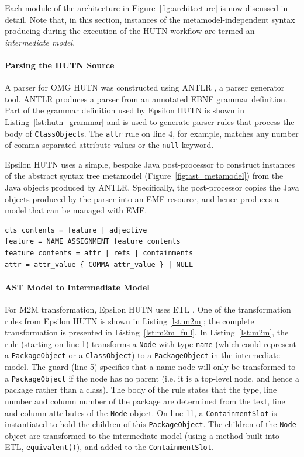 Each module of the architecture in Figure~\ref{fig:architecture} is now discussed in detail. Note that, in this section, instances of the metamodel-independent syntax producing during the execution of the HUTN workflow are termed an \textit{intermediate model}.

\paragraph{Parsing the HUTN Source}
A parser for OMG HUTN was constructed using ANTLR \cite{parr07antlr}, a parser generator tool. ANTLR produces a parser from an annotated EBNF grammar definition. Part of the grammar definition used by Epsilon HUTN is shown in Listing~\ref{lst:hutn_grammar} and is used to generate parser rules that process the body of \texttt{Cl\-a\-ssOb\-je\-ct}s. The \texttt{attr} rule on line 4, for example, matches any number of comma separated attribute values or the \texttt{null} keyword.

Epsilon HUTN uses a simple, bespoke Java post-processor to construct instances of the abstract syntax tree metamodel (Figure~\ref{fig:ast_metamodel}) from the Java objects produced by ANTLR. Specifically, the post-processor copies the Java objects produced by the parser into an EMF resource, and hence produces a model that can be managed with EMF.

\begin{lstlisting}[caption=An extract of the Epsilon HUTN grammar definition in EBNF, label=lst:hutn_grammar, language=EBNF]
cls_contents = feature | adjective
feature = NAME ASSIGNMENT feature_contents
feature_contents = attr | refs | containments
attr = attr_value { COMMA attr_value } | NULL
\end{lstlisting}

\paragraph{AST Model to Intermediate Model}
For M2M transformation, Epsilon HUTN uses ETL \cite{kolovos08etl}. One of the transformation rules from Epsilon HUTN is shown in Listing \ref{lst:m2m}; the complete transformation is presented in Listing~\ref{lst:m2m_full}. In Listing~\ref{lst:m2m}, the rule (starting on line 1) transforms a \texttt{No\-de} with type \texttt{na\-me} (which could represent a \texttt{P\-ac\-ka\-geOb\-je\-ct} or a \texttt{Cl\-a\-ssOb\-je\-ct}) to a \texttt{P\-ac\-ka\-geOb\-je\-ct} in the intermediate model. The guard (line 5) specifies that a name node will only be transformed to a \texttt{P\-ac\-ka\-geOb\-je\-ct} if the node has no parent (i.e. it is a top-level node, and hence a package rather than a class). The body of the rule states that the type, line number and column number of the package are determined from the text, line and column attributes of the \texttt{No\-de} object. On line 11, a \texttt{Co\-nt\-ai\-nm\-e\-ntSl\-ot} is instantiated to hold the children of this \texttt{P\-ac\-ka\-geOb\-je\-ct}. The children of the \texttt{No\-de} object are transformed to the intermediate model (using a method built into ETL, \texttt{eq\-ui\-va\-lent()}), and added to the \texttt{Co\-nt\-ai\-nm\-e\-ntSl\-ot}.

